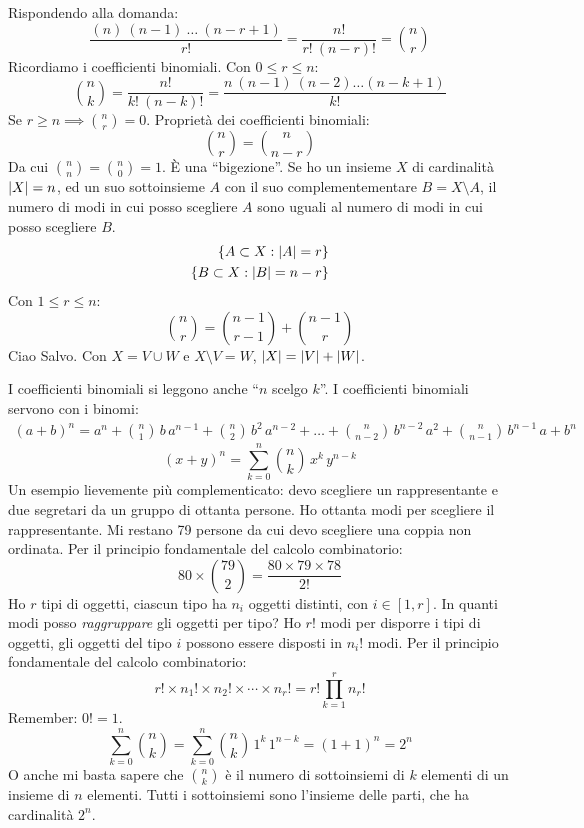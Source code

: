 Rispondendo alla domanda:
\[
\frac{(n) \ (n-1) \ \ldots \ (n - r + 1)}{r!} =
\frac{ n! }{ r! \ (n-r)! } = 
\binom{n}{r}
\]
Ricordiamo i coefficienti binomiali. Con $0 \le r \le n$:
\[
\binom{n}{k} = \frac{n!}{k! \ (n-k)!} = 
\frac{n \ (n - 1) \ (n - 2) \ldots (n - k + 1)}{k!}
\]
Se $r \geq n \implies \binom{n}{r} = 0$. Propriet\`a dei coefficienti binomiali:
\[
\binom{n}{r} = \binom{n}{n-r}
\]
Da cui $\binom{n}{n} = \binom{n}{0} = 1$. \`E una ``bigezione''. Se ho un insieme $X$ di cardinalit\`a $\left\lvert{X}\right\rvert = n$, ed un suo sottoinsieme $A$ con il suo complementementare $B = X \setminus A$, il numero di modi in cui posso scegliere $A$ sono uguali al numero di modi in cui posso scegliere $B$.
\begin{align*}
\left\{A \subset X : \left\lvert{A}\right\rvert = r\right\} \\
\left\{B \subset X : \left\lvert{B}\right\rvert = n - r\right\}
\end{align*}
Con $1 \leq r \leq n$:
\[
\binom{n}{r} = \binom{n-1}{r-1} + \binom{n-1}{r}
\]
Ciao Salvo. Con $X = V \cup W$ e $X \setminus V = W$, $\left\lvert{X}\right\rvert = \left\lvert{V}\right\rvert + \left\lvert{W}\right\rvert$.

I coefficienti binomiali si leggono anche ``$n$ scelgo $k$''. I coefficienti binomiali servono con i binomi:
\begin{multline*}
(a+b)^n = 
a^n 
+ \binom{n}{1} \, b \, a^{n-1} 
+ \binom{n}{2} \, b^2 \, a^{n-2} 
+ \ldots 
+ \binom{n}{n-2} \, b^{n-2} \, a^2
+ \binom{n}{n-1} \, b^{n-1} \, a
+ b^n
\end{multline*}
\[
(x+y)^n = \sum_{k=0}^{n} \binom{n}{k} \, x^k \, y^{n-k}
\]
Un esempio lievemente pi\`u complementicato: devo scegliere un rappresentante e due segretari da un gruppo di ottanta persone. Ho ottanta modi per scegliere il rappresentante. Mi restano 79 persone da cui devo scegliere una coppia non ordinata. Per il principio fondamentale del calcolo combinatorio:
\[
80 \times \binom{79}{2} = \frac{80 \times 79 \times 78}{2!}
\]
Ho $r$ tipi di oggetti, ciascun tipo ha $n_i$ oggetti distinti, con $i \in [1,r]$. In quanti modi posso \textit{raggruppare} gli oggetti per tipo? Ho $r!$ modi per disporre i tipi di oggetti, gli oggetti del tipo $i$ possono essere disposti in $n_i!$ modi. Per il principio fondamentale del calcolo combinatorio:
\[
r! \times n_1! \times n_2! \times \cdots \times n_r! = 
r! \prod_{k = 1}^{r} n_r!
\]
Remember: $0! = 1$.
\[
\sum_{k=0}^{n} \binom{n}{k} = \sum_{k=0}^{n} \binom{n}{k} \, 1^k \, 1^{n-k} = (1 + 1)^n = 2^n
\]
O anche mi basta sapere che $\binom{n}{k}$ \`e il numero di sottoinsiemi di $k$ elementi di un insieme di $n$ elementi. Tutti i sottoinsiemi sono l'insieme delle parti, che ha cardinalit\`a $2^n$.


